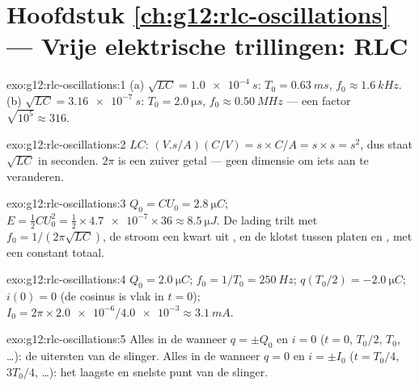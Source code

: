\section*{Hoofdstuk \ref{ch:g12:rlc-oscillations} --- Vrije elektrische trillingen: RLC}

\begin{solution}{exo:g12:rlc-oscillations:1}
(a) $\sqrt{LC} = \qty{1.0e-4}{s}$: $T_0 = \qty{0.63}{ms}$,
$f_0 \approx \qty{1.6}{kHz}$. (b) $\sqrt{LC} = \qty{3.16e-7}{s}$:
$T_0 = \qty{2.0}{\micro s}$, $f_0 \approx \qty{0.50}{MHz}$ --- een factor
$\sqrt{10^5} \approx 316$.
\end{solution}

\begin{solution}{exo:g12:rlc-oscillations:2}
$LC$: $(\unit{V.s/A})(\unit{C/V}) = \unit{s} \times \unit{C/A} =
\unit{s} \times \unit{s} = \unit{s^2}$, dus staat $\sqrt{LC}$ in seconden.
$2\pi$ is een zuiver getal --- geen dimensie om iets aan te veranderen.
\end{solution}

\begin{solution}{exo:g12:rlc-oscillations:3}
$Q_0 = CU_0 = \qty{2.8}{\micro C}$; $E = \tfrac12 CU_0^2 =
\tfrac12 \times \num{4.7e-7} \times 36 \approx \qty{8.5}{\micro J}$. De lading
trilt met $f_0 = 1/(2\pi\sqrt{LC})$, de stroom een kwart  uit , en
de  klotst tussen platen en , met een constant totaal.
\end{solution}

\begin{solution}{exo:g12:rlc-oscillations:4}
$Q_0 = \qty{2.0}{\micro C}$; $f_0 = 1/T_0 = \qty{250}{Hz}$;
$q(T_0/2) = \qty{-2.0}{\micro C}$; $i(0) = 0$ (de cosinus is vlak in $t=0$);
$I_0 = 2\pi \times \num{2.0e-6}/\num{4.0e-3} \approx \qty{3.1}{mA}$.
\end{solution}

\begin{solution}{exo:g12:rlc-oscillations:5}
Alles in de  wanneer $q = \pm Q_0$ en $i = 0$ ($t = 0$, $T_0/2$,
$T_0$, \dots): de uitersten van de slinger. Alles in de  wanneer $q = 0$
en $i = \pm I_0$ ($t = T_0/4$, $3T_0/4$, \dots): het laagste en snelste punt
van de slinger.
\end{solution}

